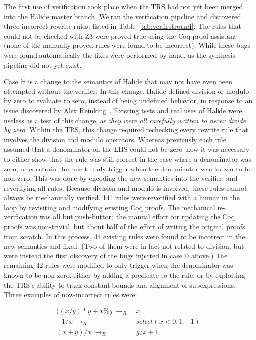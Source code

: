 \documentclass[acmsmall,review,anonymous]{acmart}\settopmatter{printfolios=true,printccs=false,printacmref=false}
\newcommand{\rewrites}[0]{\:\rightarrow_{R}\:}
\begin{document}
The first use of verification took place when the TRS had not yet been merged into the Halide master branch. We ran the verification pipeline and discovered three incorrect rewrite rules, listed in Table~\ref{tab:verfirstround}. The rules that could not be checked with Z3 were proved true using the Coq proof assistant (none of the manually proved rules were found to be incorrect). While these bugs were found automatically the fixes were performed by hand, as the synthesis pipeline did not yet exist. 

Case $\mathbb{H}$ is a change to the semantics of Halide that may not have even been attempted without the verifier. In this change, Halide defined division or modulo by zero to evaluate to zero, instead of being undefined behavior, in response to an issue discovered by Alex Reinking~\cite{reinkingthesis}. Existing tests and real uses of Halide were useless as a test of this change, as \emph{they were all carefully written to never divide by zero}. Within the TRS, this change required rechecking every rewrite rule that involves the division and modulo operators. Whereas previously each rule assumed that a denominator on the LHS could not be zero, now it was necessary to either show that the rule was still correct in the case where a denominator was zero, or constrain the rule to only trigger when the denominator was known to be non-zero. This was done by encoding the new semantics into the verifier, and reverifying all rules. Because division and modulo is involved, these rules cannot always be mechanically verified. 141 rules were reverified with a human in the loop by revisiting and modifying existing Coq proofs. The mechanical re-verification was all but push-button; the manual effort for updating the Coq proofs was non-trivial, but about half of the effort of writing the original proofs from scratch. In this process, 44 existing rules were found to be incorrect in the new semantics and fixed. (Two of them were in fact not related to division, but were instead the first discovery of the bugs injected in case $\mathbb{D}$ above.) The remaining 42 rules were modified to only trigger when the denominator was known to be non-zero, either by adding a predicate to the rule, or by exploiting the TRS’s ability to track constant bounds and alignment of subexpressions. Three examples of now-incorrect rules were:

\begin{align*}
((x/y)*y + x\%y \rewrites & x \\
  -1 / x \rewrites & select(x < 0, 1, -1) \\
(x + y)/x \rewrites & y/x + 1
\end{align*}
\end{document}
